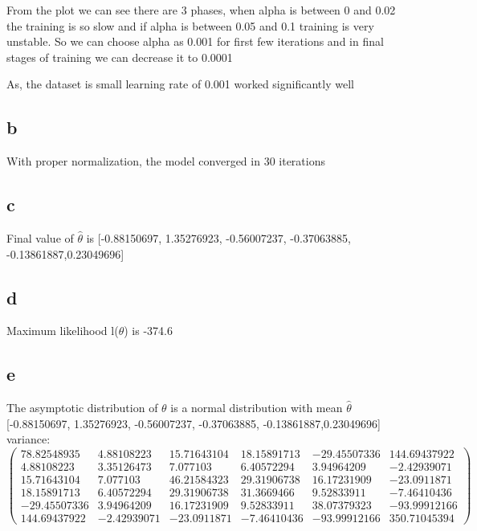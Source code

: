 \documentclass{article}
\begin{document}
From the plot we can see there are 3 phases, when alpha is between 0 and 0.02 the training is so slow and if alpha is between 0.05 and 0.1 training is very unstable. So we can choose alpha as 0.001 for first few iterations and in final stages of training we can decrease it to 0.0001

As, the dataset is small learning rate of 0.001 worked significantly well

\subsection{b}
With proper normalization, the model converged in 30 iterations

\subsection{c}
Final value of $\hat{\theta}$ is [-0.88150697,  1.35276923, -0.56007237, -0.37063885, -0.13861887,0.23049696]

\subsection{d}
Maximum likelihood l($\theta$) is -374.6

\subsection{e}
The asymptotic distribution of $\theta$ is a normal distribution with mean $\hat{\theta}$ \\
{[-0.88150697,  1.35276923, -0.56007237, -0.37063885, -0.13861887,0.23049696] }\\
variance: \\
$
\begin{pmatrix}
78.82548935 &  4.88108223 &  15.71643104 &  18.15891713 & -29.45507336 & 144.69437922 \\
4.88108223 &   3.35126473 &   7.077103  &   6.40572294 & 3.94964209 &  -2.42939071 \\
15.71643104 &   7.077103  &  46.21584323 &  29.31906738 & 16.17231909 & -23.0911871 \\
18.15891713 &   6.40572294 &  29.31906738 &  31.3669466 & 9.52833911 &  -7.46410436 \\
-29.45507336 &   3.94964209 &  16.17231909 &   9.52833911 & 38.07379323 & -93.99912166 \\
144.69437922 &  -2.42939071 & -23.0911871 &  -7.46410436 & -93.99912166 & 350.71045394 
\end{pmatrix}
$
\end{document}
